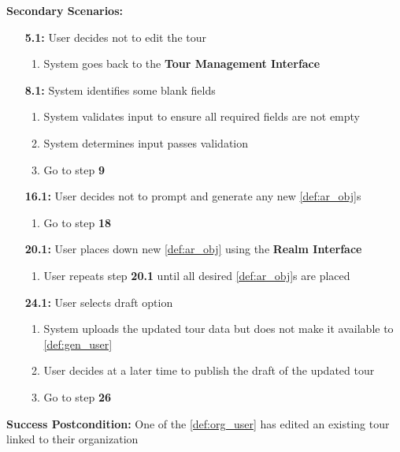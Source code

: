 \documentclass{article}
\begin{document}
\begin{enumerate}[label=\textbf{UC\arabic*}]
          \textbf{Secondary Scenarios:}
          \begin{itemize}
              \item[{\bf 5.1:}] User decides not to edit the tour
                    \begin{enumerate}[label=\textbf{\arabic*.}]
                        \item System goes back to the \textbf{Tour Management Interface}
                    \end{enumerate}
              \item[{\bf 8.1:}] System identifies some blank fields
                    \begin{enumerate}[label=\textbf{\arabic*.}]
                        \item System validates input to ensure all required fields are not empty
                        \item System determines input passes validation
                        \item Go to step \textbf{9}
                    \end{enumerate}
              \item[{\bf 16.1:}] User decides not to prompt and generate any new \ref{def:ar_obj}s
                    \begin{enumerate}[label=\textbf{\arabic*.}]
                        \item Go to step \textbf{18}
                    \end{enumerate}
              \item[{\bf 20.1:}] User places down new \ref{def:ar_obj} using the \textbf{Realm Interface}
                    \begin{enumerate}[label=\textbf{\arabic*.}]
                        \item User repeats step \textbf{20.1} until all desired \ref{def:ar_obj}s are placed
                    \end{enumerate}
              \item[{\bf 24.1:}] User selects draft option
                    \begin{enumerate}[label=\textbf{\arabic*.}]
                        \item System uploads the updated tour data but does not make it available to \ref{def:gen_user}
                        \item User decides at a later time to publish the draft of the updated tour
                        \item Go to step \textbf{26}
                    \end{enumerate}
          \end{itemize}
          \textbf{Success Postcondition:} One of the \ref{def:org_user} has edited an existing tour linked to their organization


\end{enumerate}
\end{document}
